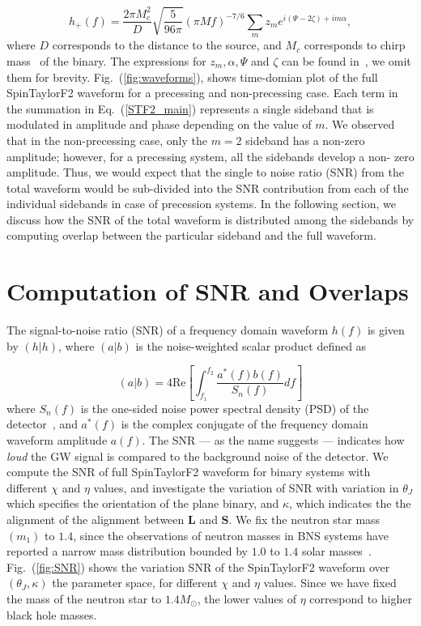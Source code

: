 \begin{equation}  
\label{STF2_main} 
h_{+}(f) =
\dfrac{2\pi M_{c}^{2}}{D}\sqrt{\dfrac{5}{96\pi}}(\pi M
f)^{-7/6}\sum_{m}z_{m}e^{i(\Psi - 2\zeta) + i m \alpha},
\end{equation} 
where $D$ corresponds to the distance to the source, and $M_{c}$ corresponds to
chirp mass~\cite{Creighton} of the binary. The expressions for $z_{m}, \alpha,
\Psi$ and $\zeta$  can be found in~\cite{Lundgren2014}, we omit them for
brevity. Fig.~(\ref{fig:waveforms}), shows  time-domian plot of the full
SpinTaylorF2 waveform for a precessing and non-precessing case. Each term in the
summation in Eq.~(\ref{STF2_main}) represents a single sideband that is
modulated in amplitude and phase depending on the value of $m$.  We observed
that in  the non-precessing case, only the $m=2$ sideband has a non-zero
amplitude; however, for a precessing system, all the sidebands develop a non-
zero amplitude. Thus, we would expect that the single to noise ratio (SNR) from
the total waveform would be sub-divided into the SNR contribution from each of
the individual sidebands in case of precession systems. In the following section, 
we discuss how the SNR of the total waveform is distributed among the sidebands
by computing overlap between the particular sideband and the full waveform.


\section{Computation of SNR and Overlaps}

The signal-to-noise ratio (SNR) of a frequency domain waveform $h(f)$ is given by 
$(h|h)$, where $(a|b)$ is the noise-weighted scalar product defined as 

\label{inner_product}  
\begin{equation} (a|b) = 4 \text{Re} \left[
\int_{f_{1}}^{f_{2}}  \dfrac{a^{*}(f)b(f)}{S_{n}(f)} df\right] 
\end{equation}
where $S_{n}(f)$ is the one-sided noise power spectral density (PSD) of the
detector~\cite{PSD}, and $a^{*}(f)$ is the complex conjugate of the frequency
domain waveform amplitude $a(f)$. The SNR --- as the name suggests --- indicates
how \textit{loud} the GW signal is compared to the background noise of the
detector. We compute the SNR of full SpinTaylorF2 waveform for binary systems
with  different $\chi$ and $\eta$ values, and investigate the variation of SNR
with variation in $\theta_{J}$ which specifies the orientation of the plane
binary, and $\kappa$, which indicates the the alignment of the alignment between
$\mathbf{L}$ and $\mathbf{S}$. We fix the neutron star mass $(m_{1})$ to $1.4$,
since the observations of neutron masses in BNS systems have reported a narrow
mass distribution bounded by $1.0$ to $1.4$ solar masses~\cite{Lorimer}.
Fig.~(\ref{fig:SNR}) shows the variation SNR of the SpinTaylorF2 waveform   over
$(\theta_J, \kappa)$ the parameter space, for different $\chi$ and $\eta$
values. Since we have fixed the mass of the neutron star to $1.4 M_{\odot}$, the
lower values of $\eta$ correspond to higher black hole masses.

